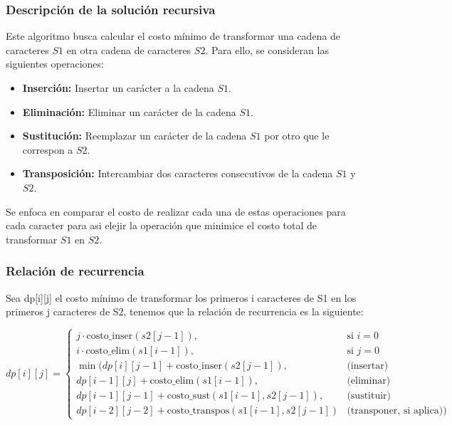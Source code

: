 
\subsubsection{Descripción de la solución recursiva}

Este algoritmo busca calcular el costo mínimo de transformar una cadena de caracteres $S1$ en otra 
cadena de caracteres $S2$. Para ello, se consideran las siguientes operaciones:
\begin{itemize}
    \item \textbf{Inserción:} Insertar un carácter a la cadena $S1$.
    \item \textbf{Eliminación:} Eliminar un carácter de la cadena $S1$.
    \item \textbf{Sustitución:} Reemplazar un carácter de la cadena $S1$ por otro que le correspon a $S2$.
    \item \textbf{Transposición:} Intercambiar dos caracteres consecutivos de la cadena $S1$ y $S2$.
\end{itemize}


Se enfoca en comparar el costo de realizar cada una de estas operaciones para cada caracter para asi 
elejir la operación que minimice el costo total de transformar $S1$ en $S2$.

\subsubsection{Relación de recurrencia}

Sea dp[i][j] el costo mínimo de transformar los primeros i caracteres de S1 en los primeros j caracteres de S2, 
tenemos que la relación de recurrencia es la siguiente:

\[
dp[i][j] =
\begin{cases} 
    j \cdot \text{costo\_inser}(s2[j-1]), & \text{si } i = 0 \\
    i \cdot \text{costo\_elim}(s1[i-1]), & \text{si } j = 0 \\
    \min \bigg(
        dp[i][j-1] + \text{costo\_inser}(s2[j-1]), & \text{(insertar)} \\
        dp[i-1][j] + \text{costo\_elim}(s1[i-1]), & \text{(eliminar)} \\
        dp[i-1][j-1] + \text{costo\_sust}(s1[i-1], s2[j-1]), & \text{(sustituir)} \\
        dp[i-2][j-2] + \text{costo\_transpos}(s1[i-1], s2[j-1]) & \text{(transponer, si aplica)} 
    \bigg)
\end{cases}
\]

